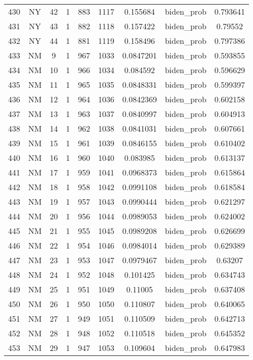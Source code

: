 \documentclass[12pt,a4paper]{article}
\begin{document}
\begin{tabular}{r|cccccccc}
	430 & NY & 42 & 1 & 883 & 1117 & 0.155684 & biden\_prob & 0.793641 \\
	431 & NY & 43 & 1 & 882 & 1118 & 0.157422 & biden\_prob & 0.79552 \\
	432 & NY & 44 & 1 & 881 & 1119 & 0.158496 & biden\_prob & 0.797386 \\
	433 & NM & 9 & 1 & 967 & 1033 & 0.0847201 & biden\_prob & 0.593855 \\
	434 & NM & 10 & 1 & 966 & 1034 & 0.084592 & biden\_prob & 0.596629 \\
	435 & NM & 11 & 1 & 965 & 1035 & 0.0848331 & biden\_prob & 0.599397 \\
	436 & NM & 12 & 1 & 964 & 1036 & 0.0842369 & biden\_prob & 0.602158 \\
	437 & NM & 13 & 1 & 963 & 1037 & 0.0840997 & biden\_prob & 0.604913 \\
	438 & NM & 14 & 1 & 962 & 1038 & 0.0841031 & biden\_prob & 0.607661 \\
	439 & NM & 15 & 1 & 961 & 1039 & 0.0846155 & biden\_prob & 0.610402 \\
	440 & NM & 16 & 1 & 960 & 1040 & 0.083985 & biden\_prob & 0.613137 \\
	441 & NM & 17 & 1 & 959 & 1041 & 0.0968373 & biden\_prob & 0.615864 \\
	442 & NM & 18 & 1 & 958 & 1042 & 0.0991108 & biden\_prob & 0.618584 \\
	443 & NM & 19 & 1 & 957 & 1043 & 0.0990444 & biden\_prob & 0.621297 \\
	444 & NM & 20 & 1 & 956 & 1044 & 0.0989053 & biden\_prob & 0.624002 \\
	445 & NM & 21 & 1 & 955 & 1045 & 0.0989208 & biden\_prob & 0.626699 \\
	446 & NM & 22 & 1 & 954 & 1046 & 0.0984014 & biden\_prob & 0.629389 \\
	447 & NM & 23 & 1 & 953 & 1047 & 0.0979467 & biden\_prob & 0.63207 \\
	448 & NM & 24 & 1 & 952 & 1048 & 0.101425 & biden\_prob & 0.634743 \\
	449 & NM & 25 & 1 & 951 & 1049 & 0.11005 & biden\_prob & 0.637408 \\
	450 & NM & 26 & 1 & 950 & 1050 & 0.110807 & biden\_prob & 0.640065 \\
	451 & NM & 27 & 1 & 949 & 1051 & 0.110509 & biden\_prob & 0.642713 \\
	452 & NM & 28 & 1 & 948 & 1052 & 0.110518 & biden\_prob & 0.645352 \\
	453 & NM & 29 & 1 & 947 & 1053 & 0.109604 & biden\_prob & 0.647983 \\

\end{tabular}
\end{document}
